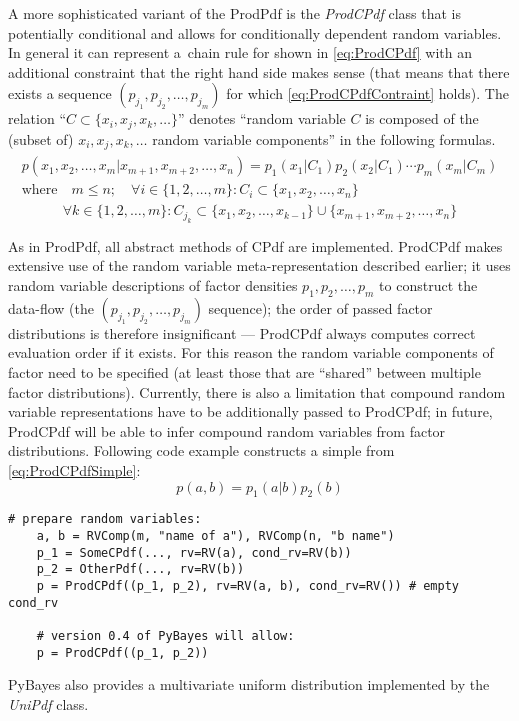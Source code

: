 A more sophisticated variant of the ProdPdf is the \emph{ProdCPdf} class that is potentially
conditional and allows for conditionally dependent random variables. In general it can represent
a~chain rule for
{\pdfs} shown in \eqref{eq:ProdCPdf} with an additional constraint that the right hand side makes
sense (that means that there exists a sequence \((p_{j_1}, p_{j_2}, \dotsc, p_{j_m})\) for which
\eqref{eq:ProdCPdfContraint} holds). The relation ``\(C \subset \{x_i, x_j, x_k, \dotsc\}\)'' denotes
``random variable \(C\) is composed of the (subset of) \(x_i, x_j, x_k, \dotsc\) random variable components''
in the following formulas.
\begin{gather} \label{eq:ProdCPdf}
	\begin{gathered}
		p(x_1, x_2, \dotsc, x_m | x_{m+1}, x_{m+2} , \dotsc, x_n) = p_1(x_1 | C_1)
			p_2(x_2 | C_1) \dotsm p_m(x_m | C_m) \\
		\text{where} \quad m \leq n; \quad
			\forall i \in \{1, 2, \dotsc, m\}: C_i \subset \{x_1, x_2, \dotsc, x_n\}
	\end{gathered}
\end{gather}
\begin{equation} \label{eq:ProdCPdfContraint}
	\forall k \in \{1, 2, \dotsc, m\}: C_{j_k} \subset \{x_1, x_2, \dotsc, x_{k-1}\} \cup \{x_{m+1}, x_{m+2} , \dotsc, x_n\}
\end{equation}

As in ProdPdf, all abstract methods of CPdf are implemented.
ProdCPdf makes extensive use of the random variable meta-representation described earlier; it uses
random variable descriptions of factor densities \(p_1, p_2, \dotsc, p_m\) to construct the
data-flow (the \((p_{j_1}, p_{j_2}, \dotsc, p_{j_m})\) sequence); the order of passed factor
distributions is therefore insignificant --- ProdCPdf always computes correct evaluation order if
it exists. For this reason the random variable components of factor {\pdfs} need to be specified
(at least those that are ``shared'' between multiple factor distributions). Currently, there is also
a limitation that compound random variable representations have to be additionally passed to ProdCPdf;
in future, ProdCPdf will be able to infer compound random variables from factor distributions.
Following code example constructs a simple {\pdf} from \eqref{eq:ProdCPdfSimple}:
\begin{equation} \label{eq:ProdCPdfSimple}
	p(a,b) = p_1(a|b) p_2(b)
\end{equation}

\begin{Verbatim}[samepage=true,gobble=1,label=ProdCPdf example,frame=single]
	# prepare random variables:
	a, b = RVComp(m, "name of a"), RVComp(n, "b name")
	p_1 = SomeCPdf(..., rv=RV(a), cond_rv=RV(b))
	p_2 = OtherPdf(..., rv=RV(b))
	p = ProdCPdf((p_1, p_2), rv=RV(a, b), cond_rv=RV()) # empty cond_rv

	# version 0.4 of PyBayes will allow:
	p = ProdCPdf((p_1, p_2))
\end{Verbatim}
PyBayes also provides a multivariate uniform distribution implemented by the \emph{UniPdf} class.

